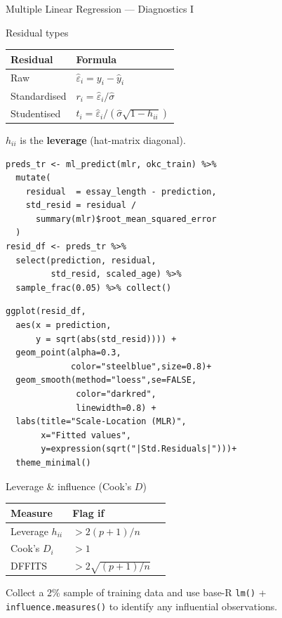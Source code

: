 \documentclass[11pt, aspectratio=169]{beamer}
\begin{document}
\begin{frame}{Multiple Linear Regression --- Diagnostics I}
	\begin{block}{Residual types}
				\begin{tabular}{ll}
					\toprule
					\textbf{Residual} & \textbf{Formula}\\
					\midrule
					Raw           & $\hat\varepsilon_i = y_i - \hat y_i$\\
					Standardised  & $r_i = \hat\varepsilon_i / \hat\sigma$\\
					Studentised   & $t_i = \hat\varepsilon_i / (\hat\sigma\sqrt{1-h_{ii}})$\\
					\bottomrule
				\end{tabular}
				\medskip

				$h_{ii}$ is the \textbf{leverage} (hat-matrix diagonal).
			\end{block}
			\begin{lstlisting}[title={Residual \& standardised residual extraction}]
preds_tr <- ml_predict(mlr, okc_train) %>%
  mutate(
    residual  = essay_length - prediction,
    std_resid = residual /
      summary(mlr)$root_mean_squared_error
  )
resid_df <- preds_tr %>%
  select(prediction, residual,
         std_resid, scaled_age) %>%
  sample_frac(0.05) %>% collect()
			\end{lstlisting}
		\begin{lstlisting}[title={Scale--Location plot}]
ggplot(resid_df,
  aes(x = prediction,
      y = sqrt(abs(std_resid)))) +
  geom_point(alpha=0.3,
             color="steelblue",size=0.8)+
  geom_smooth(method="loess",se=FALSE,
              color="darkred",
              linewidth=0.8) +
  labs(title="Scale-Location (MLR)",
       x="Fitted values",
       y=expression(sqrt("|Std.Residuals|")))+
  theme_minimal()
			\end{lstlisting}
			\begin{alertblock}{Leverage \& influence (Cook's $D$)}
				\footnotesize
				\begin{tabular}{lll}
					\toprule
					\textbf{Measure} & \textbf{Flag if}\\
					\midrule
					Leverage $h_{ii}$ & $>2(p+1)/n$\\
					Cook's $D_i$ & $>1$\\
					DFFITS & $>2\sqrt{(p+1)/n}$\\
					\bottomrule
				\end{tabular}
			\end{alertblock}
			\begin{exercise}[Exercise]
				Collect a 2\% sample of training data and use base-R
				\texttt{lm()} + \texttt{influence.measures()} to identify any
				influential observations.
			\end{exercise}
		\end{frame}
\end{document}
